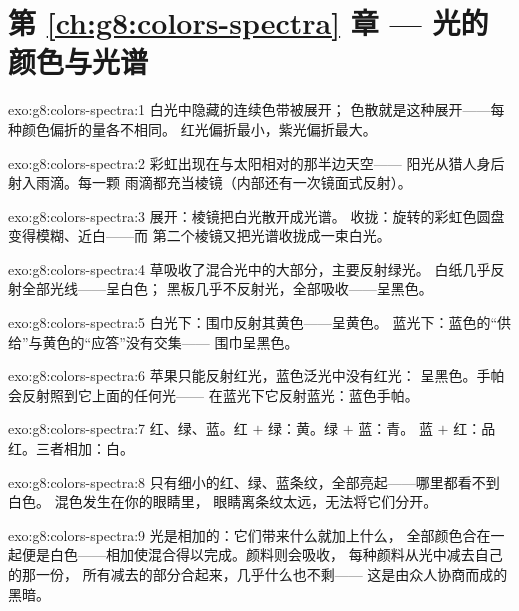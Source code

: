 \section*{第 \ref{ch:g8:colors-spectra} 章 --- 光的颜色与光谱}

\begin{solution}{exo:g8:colors-spectra:1}
白光中隐藏的连续色带被展开；
色散就是这种展开——每种颜色偏折的量各不相同。
红光偏折最小，紫光偏折最大。
\end{solution}

\begin{solution}{exo:g8:colors-spectra:2}
彩虹出现在与太阳相对的那半边天空——
阳光从猎人身后射入雨滴。每一颗
雨滴都充当棱镜（内部还有一次镜面式反射）。
\end{solution}

\begin{solution}{exo:g8:colors-spectra:3}
展开：棱镜把白光散开成光谱。
收拢：旋转的彩虹色圆盘变得模糊、近白——而
第二个棱镜又把光谱收拢成一束白光。
\end{solution}

\begin{solution}{exo:g8:colors-spectra:4}
草吸收了混合光中的大部分，主要反射绿光。
白纸几乎反射全部光线——呈白色；
黑板几乎不反射光，全部吸收——呈黑色。
\end{solution}

\begin{solution}{exo:g8:colors-spectra:5}
白光下：围巾反射其黄色——呈黄色。
蓝光下：蓝色的“供给”与黄色的“应答”没有交集——
围巾呈黑色。
\end{solution}

\begin{solution}{exo:g8:colors-spectra:6}
苹果只能反射红光，蓝色泛光中没有红光：
呈黑色。手帕会反射照到它上面的任何光——
在蓝光下它反射蓝光：蓝色手帕。
\end{solution}

\begin{solution}{exo:g8:colors-spectra:7}
红、绿、蓝。红 $+$ 绿：黄。绿 $+$ 蓝：青。
蓝 $+$ 红：品红。三者相加：白。
\end{solution}

\begin{solution}{exo:g8:colors-spectra:8}
只有细小的红、绿、蓝条纹，全部亮起——哪里都看不到白色。
混色发生在你的眼睛里，
眼睛离条纹太远，无法将它们分开。
\end{solution}

\begin{solution}{exo:g8:colors-spectra:9}
光是相加的：它们带来什么就加上什么，
全部颜色合在一起便是白色——相加使混合得以完成。颜料则会吸收，
每种颜料从光中减去自己的那一份，
所有减去的部分合起来，几乎什么也不剩——
这是由众人协商而成的黑暗。
\end{solution}

